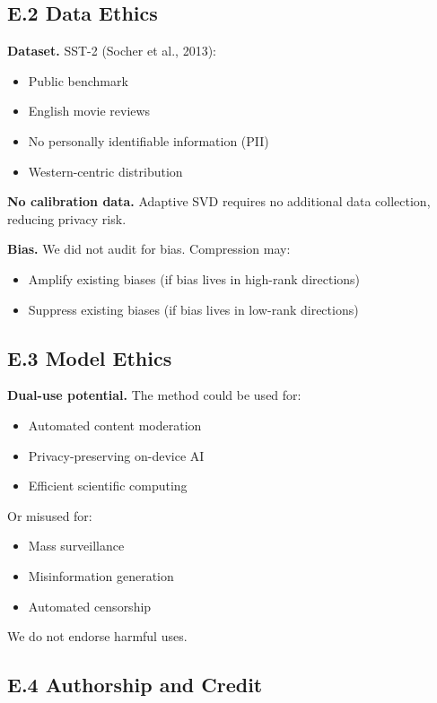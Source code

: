 \subsection{E.2 Data Ethics}

\textbf{Dataset.} SST-2 (Socher et al., 2013):
\begin{itemize}
\item Public benchmark
\item English movie reviews
\item No personally identifiable information (PII)
\item Western-centric distribution

\end{itemize}
\textbf{No calibration data.} Adaptive SVD requires no additional data collection, 
reducing privacy risk.

\textbf{Bias.} We did not audit for bias. Compression may:
\begin{itemize}
\item Amplify existing biases (if bias lives in high-rank directions)
\item Suppress existing biases (if bias lives in low-rank directions)

\end{itemize}
\subsection{E.3 Model Ethics}

\textbf{Dual-use potential.} The method could be used for:
\begin{itemize}
\item Automated content moderation
\item Privacy-preserving on-device AI
\item Efficient scientific computing

\end{itemize}
Or misused for:
\begin{itemize}
\item Mass surveillance
\item Misinformation generation
\item Automated censorship

\end{itemize}
We do not endorse harmful uses.

\subsection{E.4 Authorship and Credit}

